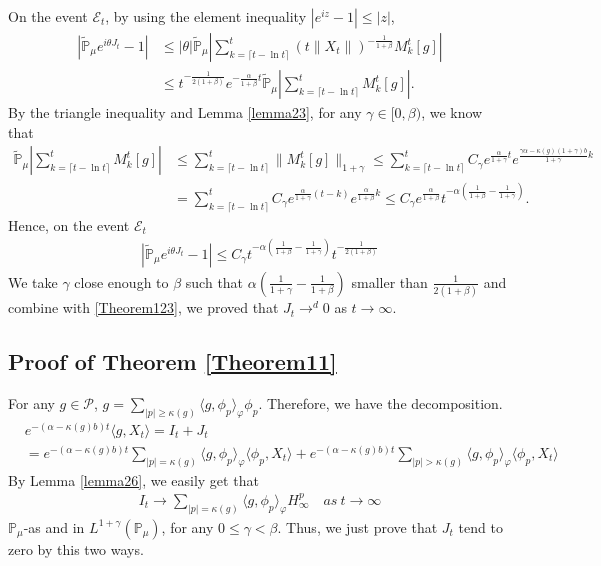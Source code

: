 \documentclass{article}
\begin{document}
On the event $\mathcal{E}_t$, by using the element inequality $|e^{i z}-1|\leq |z|$,
\begin{align*}
    \left|\mathbb{\tilde{P}}_{\mu}e^{i\theta J_t}-1\right|&\leq|\theta| \mathbb{\tilde{P}}_{\mu}\left|\sum_{k=\lceil t-\ln t \rceil}^t \left(t\|X_t\|\right)^{-\frac{1}{1+\beta}}M_k^t[g]\right|\\
    &\leq t^{-\frac{1}{2(1+\beta)}}e^{-\frac{\alpha}{1+\beta}t}\mathbb{\tilde{P}}_{\mu}\left|\sum_{k=\lceil t-\ln t \rceil}^t M_k^t[g]\right|.
\end{align*}
By the triangle inequality and Lemma \ref{lemma23}, for any $\gamma\in[0,\beta)$, we know that
\begin{align*}
    \mathbb{\tilde{P}}_{\mu}\left|\sum_{k=\lceil t-\ln t \rceil}^t M_k^t[g]\right|&\leq \sum_{k=\lceil t-\ln t \rceil}^t \|M_k^t[g]\|_{1+\gamma}\leq\sum_{k=\lceil t-\ln t \rceil}^t C_{\gamma}e^{\frac{\alpha}{1+\gamma}t}e^{\frac{\gamma \alpha-\kappa(g)(1+\gamma)b}{1+\gamma}k}\\
    &=\sum_{k=\lceil t-\ln t \rceil}^t C_{\gamma}e^{\frac{\alpha}{1+\gamma}(t-k)}e^{\frac{\alpha}{1+\beta}k}\leq C_{\gamma}e^{\frac{\alpha}{1+\beta}}t^{-\alpha(\frac{1}{1+\beta}-\frac{1}{1+\gamma})}.
\end{align*}
Hence, on the event $\mathcal{E}_t$
\begin{align*}
    \left|\mathbb{\tilde{P}}_{\mu}e^{i\theta J_t}-1\right|\leq C_{\gamma}t^{-\alpha(\frac{1}{1+\beta}-\frac{1}{1+\gamma})} t^{-\frac{1}{2(1+\beta)}}
\end{align*}
We take $\gamma$ close enough to $\beta$ such that $\alpha(\frac{1}{1+\gamma}-\frac{1}{1+\beta})$ smaller than $\frac{1}{2(1+\beta)}$ and combine with \eqref{Theorem123}, we proved that $J_t \rightarrow^d 0$ as $t\rightarrow \infty$.

\subsection{Proof of Theorem \ref{Theorem11}}
For any $g\in \mathcal{P}$, $g=\sum_{|p|\geq \kappa(g)}\langle g,\phi_p\rangle_\varphi \phi_p$. Therefore, we have the decomposition.
\begin{align*}
    &e^{-(\alpha-\kappa(g)b)t}\langle g,X_t\rangle=I_t+J_t\\
    &=e^{-(\alpha-\kappa(g)b)t}\sum_{|p|= \kappa(g)}\langle g,\phi_p\rangle_\varphi \langle \phi_p,X_t\rangle+e^{-(\alpha-\kappa(g)b)t}\sum_{|p|> \kappa(g)}\langle g,\phi_p\rangle_\varphi \langle \phi_p,X_t\rangle
\end{align*}
By Lemma \ref{lemma26}, we easily get that 
\begin{align*}
    I_t \rightarrow \sum_{|p|=\kappa(g)}\langle g, \phi_p\rangle_{\varphi} H_{\infty}^p  \quad as~ t\rightarrow \infty
\end{align*}
$\mathbb{P}_{\mu}$-as and in $L^{1+\gamma}(\mathbb{P}_{\mu})$, for any $0\leq \gamma<\beta$. Thus, we just prove that $J_t$ tend to zero by this two ways.
\end{document}
